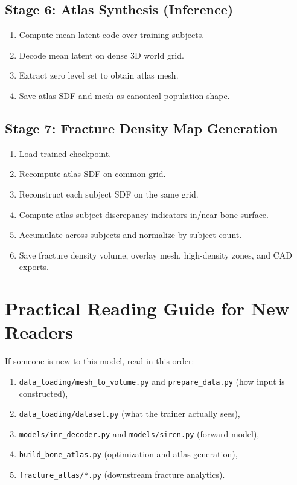 ﻿\documentclass[11pt]{article}
\begin{document}
\subsection{Stage 6: Atlas Synthesis (Inference)}
\begin{enumerate}[leftmargin=*]
    \item Compute mean latent code over training subjects.
    \item Decode mean latent on dense 3D world grid.
    \item Extract zero level set to obtain atlas mesh.
    \item Save atlas SDF and mesh as canonical population shape.
\end{enumerate}

\subsection{Stage 7: Fracture Density Map Generation}
\begin{enumerate}[leftmargin=*]
    \item Load trained checkpoint.
    \item Recompute atlas SDF on common grid.
    \item Reconstruct each subject SDF on the same grid.
    \item Compute atlas-subject discrepancy indicators in/near bone surface.
    \item Accumulate across subjects and normalize by subject count.
    \item Save fracture density volume, overlay mesh, high-density zones, and CAD exports.
\end{enumerate}

\section{Practical Reading Guide for New Readers}
If someone is new to this model, read in this order:
\begin{enumerate}[leftmargin=*]
    \item \texttt{data\_loading/mesh\_to\_volume.py} and \texttt{prepare\_data.py} (how input is constructed),
    \item \texttt{data\_loading/dataset.py} (what the trainer actually sees),
    \item \texttt{models/inr\_decoder.py} and \texttt{models/siren.py} (forward model),
    \item \texttt{build\_bone\_atlas.py} (optimization and atlas generation),
    \item \texttt{fracture\_atlas/*.py} (downstream fracture analytics).
\end{enumerate}
\end{document}
